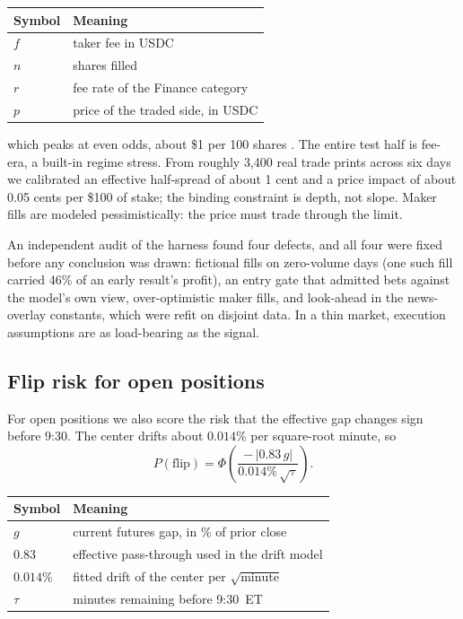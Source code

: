 \begin{center}
\small
\begin{tabular}{ll}
\toprule
Symbol & Meaning \\
\midrule
$f$ & taker fee in USDC \\
$n$ & shares filled \\
$r$ & fee rate of the Finance category \\
$p$ & price of the traded side, in USDC \\
\bottomrule
\end{tabular}
\end{center}

which peaks at even odds, about \$1 per 100 shares
\citep{polymarket2026orders}. The entire test half is fee-era,
a built-in regime stress. From roughly 3,400 real trade prints across six
days we calibrated an effective half-spread of about 1 cent and a price
impact of about 0.05 cents per \$100 of stake; the binding constraint is
depth, not slope. Maker fills are modeled pessimistically: the price must
trade through the limit.

An independent audit of the harness found four defects, and all four were
fixed before any conclusion was drawn: fictional fills on zero-volume days
(one such fill carried 46\% of an early result's profit), an entry gate
that admitted bets against the model's own view, over-optimistic maker
fills, and look-ahead in the news-overlay constants, which were refit on
disjoint data. In a thin market, execution assumptions are as load-bearing
as the signal.

\subsection{Flip risk for open positions}
\label{app:execution_flip}

For open positions we also score the risk that the effective gap changes
sign before 9:30. The center drifts about $0.014\%$ per square-root minute,
so
\begin{equation}
P(\mathrm{flip}) = \Phi\!\left(\frac{-\,\lvert 0.83\,g\rvert}
{0.014\%\,\sqrt{\tau}}\right).
\label{eq:flip}
\end{equation}

\begin{center}
\small
\begin{tabular}{ll}
\toprule
Symbol & Meaning \\
\midrule
$g$ & current futures gap, in \% of prior close \\
$0.83$ & effective pass-through used in the drift model \\
$0.014\%$ & fitted drift of the center per $\sqrt{\text{minute}}$ \\
$\tau$ & minutes remaining before 9:30~ET \\
\bottomrule
\end{tabular}
\end{center}

